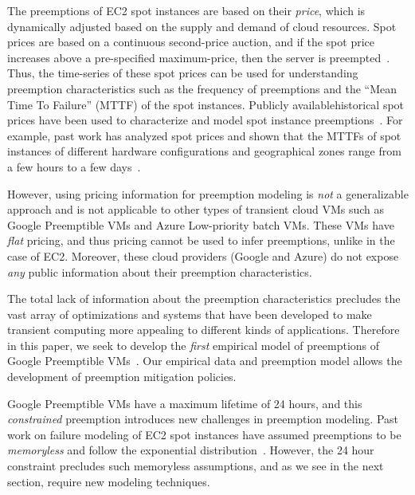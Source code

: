 The preemptions of EC2 spot instances are based on their \emph{price}, which is dynamically adjusted based on the supply and demand of cloud resources.
Spot prices are based on a continuous second-price auction, and if the spot price increases above a pre-specified maximum-price, then the server is preempted~\cite{spot-pricing2}.
%
Thus, the time-series of these spot prices can be used for understanding preemption characteristics such as the frequency of preemptions and the ``Mean Time To Failure'' (MTTF) of the spot instances. 
Publicly available\footnotemark historical spot prices have been used to characterize and model spot instance preemptions~\cite{spotcheck, bid-cloud, transient-guarantees, wolski2016providing}. %
For example, past work has analyzed spot prices and shown that the MTTFs of spot instances of different hardware configurations and geographical zones range from a few hours to a few days~\cite{wolski_probabilistic_2017, icdcs-spotlight, wolski2016providing, baughman2018predicting, wolski2017probabilistic}.

However, using pricing information for preemption modeling is \emph{not} a generalizable approach and is not applicable to other types of transient cloud VMs such as Google Preemptible VMs and Azure Low-priority batch VMs.
These VMs have \emph{flat} pricing, and thus pricing cannot be used to infer preemptions, unlike in the case of EC2.
Moreover, these cloud providers (Google and Azure) do not expose \emph{any} public information about their preemption characteristics.

The total lack of information about the preemption characteristics precludes the vast array of optimizations and systems that have been developed to make transient computing more appealing to different kinds of applications.
Therefore in this paper, we seek to develop the \emph{first} empirical model of preemptions of Google Preemptible VMs~\cite{preemptible-documentation}.
Our empirical data and preemption model allows the development of preemption mitigation policies.
%

Google Preemptible VMs have a maximum lifetime of 24 hours, and this \emph{constrained} preemption introduces new challenges in preemption modeling.
Past work on failure modeling of EC2 spot instances have assumed preemptions to be \emph{memoryless} and follow the exponential distribution~\cite{bid-cloud, hotcloud-not-bid, flint, ghit-spark-hpdc}.
However, the 24 hour constraint precludes such memoryless assumptions, and as we see in the next section, require new modeling techniques.  





